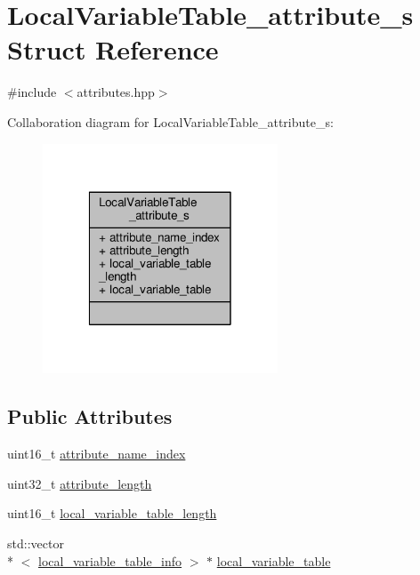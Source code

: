 \hypertarget{structLocalVariableTable__attribute__s}{\section{Local\+Variable\+Table\+\_\+attribute\+\_\+s Struct Reference}
\label{structLocalVariableTable__attribute__s}
}


{\ttfamily \#include $<$attributes.\+hpp$>$}



Collaboration diagram for Local\+Variable\+Table\+\_\+attribute\+\_\+s\+:\nopagebreak
\begin{figure}[H]
\begin{center}
\leavevmode
\includegraphics[width=198pt]{structLocalVariableTable__attribute__s__coll__graph}
\end{center}
\end{figure}
\subsection*{Public Attributes}
\begin{DoxyCompactItemize}
\item 
uint16\+\_\+t \hyperlink{structLocalVariableTable__attribute__s_ae575c0e871e3ce914f67b99e05ecae55}{attribute\+\_\+name\+\_\+index}
\item 
uint32\+\_\+t \hyperlink{structLocalVariableTable__attribute__s_a9a3749b259b8912534c5cce4e4582107}{attribute\+\_\+length}
\item 
uint16\+\_\+t \hyperlink{structLocalVariableTable__attribute__s_ac48b8efc7da2e7b280f3c592cc201888}{local\+\_\+variable\+\_\+table\+\_\+length}
\item 
std\+::vector\\*
$<$ \hyperlink{classlocal__variable__table__info}{local\+\_\+variable\+\_\+table\+\_\+info} $>$ $\ast$ \hyperlink{structLocalVariableTable__attribute__s_a5f3a593bf6cb743eba9590a81822b739}{local\+\_\+variable\+\_\+table}
\end{DoxyCompactItemize}


